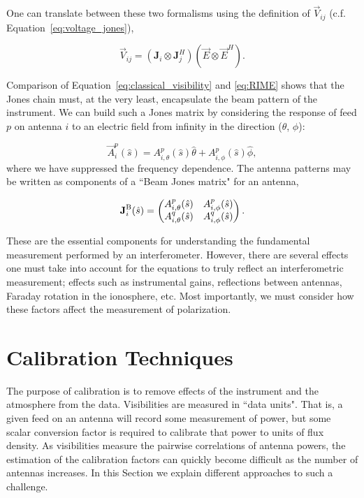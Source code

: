 One can translate between these two formalisms using the definition of $\vec{V}_{ij}$ (c.f. Equation~\ref{eq:voltage_jones}),

\begin{equation}
\vec{V}_{ij} = (\textbf{J}_i \otimes \textbf{J}_j^H)(\vec{E}\otimes\vec{E}^H).
\end{equation}

Comparison of Equation~\ref{eq:classical_visibility} and \ref{eq:RIME} shows that the Jones chain must, at the very least, encapsulate the beam pattern of the instrument. We can build such a Jones matrix by considering the response of feed $p$ on antenna $i$ to an electric field from infinity in the direction ($\theta$, $\phi$):

\begin{equation}
\vec{A}_i^p(\hat{s}) = A^p_{i,\theta}(\hat{s})\hat{\theta} + A^p_{i,\phi}(\hat{s})\hat{\phi},
\end{equation}
where we have suppressed the frequency dependence. The antenna patterns may be written as components of a ``Beam Jones matrix" for an antenna,

\begin{equation}
\textbf{J}_i^{\rm B}(\hat{s}) = 
\begin{pmatrix}
A^p_{i,\theta}(\hat{s}) & A^p_{i,\phi}(\hat{s}) \\
A^q_{i,\theta}(\hat{s}) & A^q_{i,\phi}(\hat{s}) \\
\end{pmatrix}.
\label{eq:jones-beam}
\end{equation}

These are the essential components for understanding the fundamental measurement performed by an interferometer. However, there are several effects one must take into account for the equations to truly reflect an interferometric measurement; effects such as instrumental gains, reflections between antennas, Faraday rotation in the ionosphere, etc. Most importantly, we must consider how these factors affect the measurement of polarization.

\section{Calibration Techniques}
\label{sec:interferometry_cal}

The purpose of calibration is to remove effects of the instrument and the atmosphere from the data. Visibilities are measured in ``data units". That is, a given feed on an antenna will record some measurement of power, but some scalar conversion factor is required to calibrate that power to units of flux density. As visibilities measure the pairwise correlations of antenna powers, the estimation of the calibration factors can quickly become difficult as the number of antennas increases. In this Section we explain different approaches to such a challenge.


